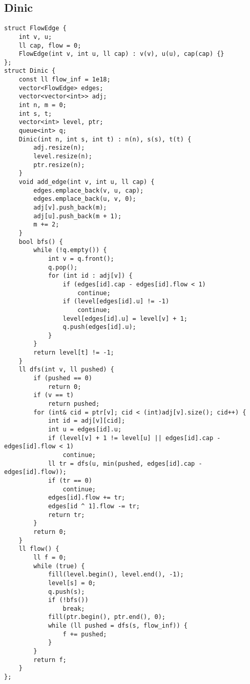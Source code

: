 \documentclass[landscape, 8pt, a4paper, oneside, twocolumn]{extarticle}
\begin{document}
\subsection{Dinic}
\begin{verbatim}
struct FlowEdge {
    int v, u;
    ll cap, flow = 0;
    FlowEdge(int v, int u, ll cap) : v(v), u(u), cap(cap) {}
};
struct Dinic {
    const ll flow_inf = 1e18;
    vector<FlowEdge> edges;
    vector<vector<int>> adj;
    int n, m = 0;
    int s, t;
    vector<int> level, ptr;
    queue<int> q;
    Dinic(int n, int s, int t) : n(n), s(s), t(t) {
        adj.resize(n);
        level.resize(n);
        ptr.resize(n);
    }
    void add_edge(int v, int u, ll cap) {
        edges.emplace_back(v, u, cap);
        edges.emplace_back(u, v, 0);
        adj[v].push_back(m);
        adj[u].push_back(m + 1);
        m += 2;
    }
    bool bfs() {
        while (!q.empty()) {
            int v = q.front();
            q.pop();
            for (int id : adj[v]) {
                if (edges[id].cap - edges[id].flow < 1)
                    continue;
                if (level[edges[id].u] != -1)
                    continue;
                level[edges[id].u] = level[v] + 1;
                q.push(edges[id].u);
            }
        }
        return level[t] != -1;
    }
    ll dfs(int v, ll pushed) {
        if (pushed == 0)
            return 0;
        if (v == t)
            return pushed;
        for (int& cid = ptr[v]; cid < (int)adj[v].size(); cid++) {
            int id = adj[v][cid];
            int u = edges[id].u;
            if (level[v] + 1 != level[u] || edges[id].cap - edges[id].flow < 1)
                continue;
            ll tr = dfs(u, min(pushed, edges[id].cap - edges[id].flow));
            if (tr == 0)
                continue;
            edges[id].flow += tr;
            edges[id ^ 1].flow -= tr;
            return tr;
        }
        return 0;
    }
    ll flow() {
        ll f = 0;
        while (true) {
            fill(level.begin(), level.end(), -1);
            level[s] = 0;
            q.push(s);
            if (!bfs())
                break;
            fill(ptr.begin(), ptr.end(), 0);
            while (ll pushed = dfs(s, flow_inf)) {
                f += pushed;
            }
        }
        return f;
    }
};
\end{verbatim}
\end{document}
